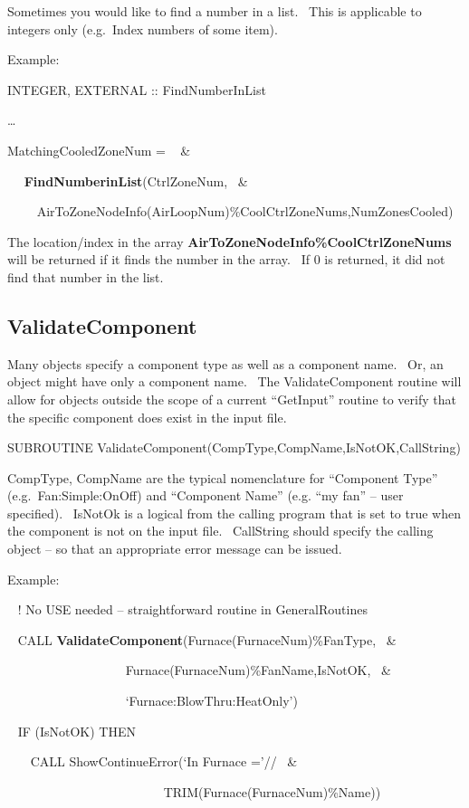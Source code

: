 Sometimes you would like to find a number in a list.~ This is applicable to integers only (e.g.~Index numbers of some item).

Example:

INTEGER, EXTERNAL :: FindNumberInList

\ldots{}

MatchingCooledZoneNum = ~ \&

~~ \textbf{FindNumberinList}(CtrlZoneNum,~ \&

~~~~ AirToZoneNodeInfo(AirLoopNum)\%CoolCtrlZoneNums,NumZonesCooled)

The location/index in the array \textbf{AirToZoneNodeInfo\%CoolCtrlZoneNums} will be returned if it finds the number in the array.~ If 0 is returned, it did not find that number in the list.

\subsection{ValidateComponent}\label{validatecomponent}

Many objects specify a component type as well as a component name.~ Or, an object might have only a component name.~ The ValidateComponent routine will allow for objects outside the scope of a current ``GetInput'' routine to verify that the specific component does exist in the input file.

SUBROUTINE ValidateComponent(CompType,CompName,IsNotOK,CallString)

CompType, CompName are the typical nomenclature for ``Component Type'' (e.g.~Fan:Simple:OnOff) and ``Component Name'' (e.g. ``my fan'' -- user specified).~ IsNotOk is a logical from the calling program that is set to true when the component is not on the input file.~ CallString should specify the calling object -- so that an appropriate error message can be issued.

Example:

~ ! No USE needed -- straightforward routine in GeneralRoutines

~ CALL \textbf{ValidateComponent}(Furnace(FurnaceNum)\%FanType,~ \&

~~~~~~~~~~~~~~~~~~ Furnace(FurnaceNum)\%FanName,IsNotOK,~ \&

~~~~~~~~~~~~~~~~~~ `Furnace:BlowThru:HeatOnly')

~ IF (IsNotOK) THEN

~~~ CALL ShowContinueError(`In Furnace ='//~ \&

~~~~~~~~~~~~~~~~~~~~~~~~ TRIM(Furnace(FurnaceNum)\%Name))


